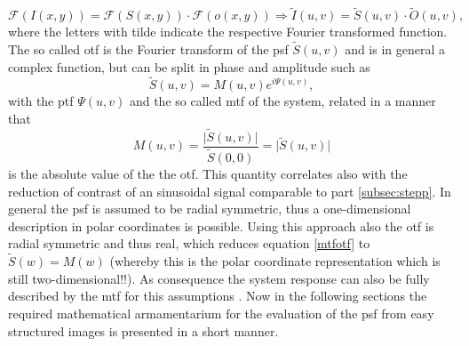 \begin{equation}
\mathcal{F}(I(x,y)) = \mathcal{F}(S(x,y))\cdot \mathcal{F}(o(x,y)) \Rightarrow \tilde{I}(u,v) = \tilde{S}(u,v)\cdot \tilde{O}(u,v), 
\end{equation}
where the letters with tilde indicate the respective Fourier transformed function. The so called \gls{otf} is the Fourier transform of the \acrlong{psf} $\tilde{S}(u,v)$ and is in general a complex function, but can be split in phase and amplitude such as
\begin{equation}\label{mtfotf}
\tilde{S}(u,v) = M(u,v)e^{i\Psi(u,v)},
\end{equation}
with the \gls{ptf} $\Psi(u,v)$ and the so called \acrlong{mtf} of the system, related in a manner that
\begin{equation}
M(u,v) = \frac{\lvert \tilde{S}(u,v)\rvert}{\tilde{S}(0,0)} = \lvert \tilde{S}(u,v) \rvert
\end{equation}
is the absolute value of the the \gls{otf}. This quantity correlates also with the reduction of contrast of an sinusoidal signal comparable to part \ref{subsec:stepp}. In general the \gls{psf} is assumed to be radial symmetric, thus a one-dimensional description in polar coordinates is possible. Using this approach also the \gls{otf} is radial symmetric and thus real, which reduces equation \ref{mtfotf} to $\tilde{S}(w) = M(w)$ (whereby this is the polar coordinate representation which is still two-dimensional!!). As consequence the system response can also be fully described by the \gls{mtf} for this assumptions \citep{Donath2007}. Now in the following sections the required mathematical armamentarium for the evaluation of the \gls{psf} from easy structured images is presented in a short manner. 
